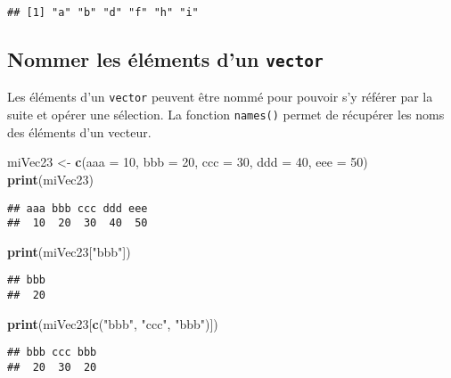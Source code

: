 \documentclass[]{book}
\newenvironment{Shaded}{\begin{snugshade}}{\end{snugshade}}
\newcommand{\KeywordTok}[1]{\textcolor[rgb]{0.13,0.29,0.53}{\textbf{#1}}}
\newcommand{\DataTypeTok}[1]{\textcolor[rgb]{0.13,0.29,0.53}{#1}}
\newcommand{\DecValTok}[1]{\textcolor[rgb]{0.00,0.00,0.81}{#1}}
\newcommand{\StringTok}[1]{\textcolor[rgb]{0.31,0.60,0.02}{#1}}
\newcommand{\NormalTok}[1]{#1}
\theoremstyle{definition}
\theoremstyle{definition}
\theoremstyle{definition}
\theoremstyle{remark}
\begin{document}
\begin{verbatim}
## [1] "a" "b" "d" "f" "h" "i"
\end{verbatim}

\subsection{\texorpdfstring{Nommer les éléments d'un
\texttt{vector}}{Nommer les éléments d'un vector}}\label{nommer-les-elements-dun-vector}

Les éléments d'un \texttt{vector} peuvent être nommé pour pouvoir s'y
référer par la suite et opérer une sélection. La fonction
\texttt{names()} permet de récupérer les noms des éléments d'un vecteur.

\begin{Shaded}
\begin{Highlighting}[]
\NormalTok{miVec23 <-}\StringTok{ }\KeywordTok{c}\NormalTok{(}\DataTypeTok{aaa =} \DecValTok{10}\NormalTok{, }\DataTypeTok{bbb =} \DecValTok{20}\NormalTok{, }\DataTypeTok{ccc =} \DecValTok{30}\NormalTok{, }\DataTypeTok{ddd =} \DecValTok{40}\NormalTok{, }\DataTypeTok{eee =} \DecValTok{50}\NormalTok{)}
\KeywordTok{print}\NormalTok{(miVec23)}
\end{Highlighting}
\end{Shaded}

\begin{verbatim}
## aaa bbb ccc ddd eee 
##  10  20  30  40  50
\end{verbatim}

\begin{Shaded}
\begin{Highlighting}[]
\KeywordTok{print}\NormalTok{(miVec23[}\StringTok{"bbb"}\NormalTok{])}
\end{Highlighting}
\end{Shaded}

\begin{verbatim}
## bbb 
##  20
\end{verbatim}

\begin{Shaded}
\begin{Highlighting}[]
\KeywordTok{print}\NormalTok{(miVec23[}\KeywordTok{c}\NormalTok{(}\StringTok{"bbb"}\NormalTok{, }\StringTok{"ccc"}\NormalTok{, }\StringTok{"bbb"}\NormalTok{)])}
\end{Highlighting}
\end{Shaded}

\begin{verbatim}
## bbb ccc bbb 
##  20  30  20
\end{verbatim}
\end{document}
